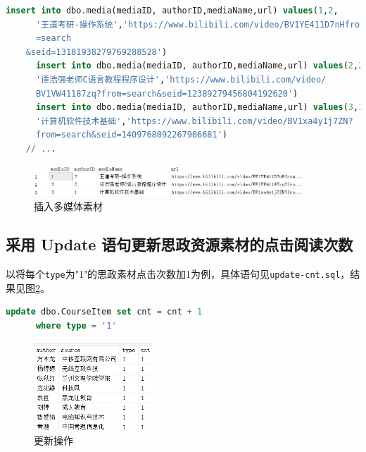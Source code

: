 \documentclass[11pt]{article}
\begin{document}
  \begin{file}
    \begin{lstlisting}[language=sql]
      insert into dbo.media(mediaID, authorID,mediaName,url) values(1,2,
      '王道考研-操作系统','https://www.bilibili.com/video/BV1YE411D7nHfrom
      =search
    &seid=13181938279769288528')
      insert into dbo.media(mediaID, authorID,mediaName,url) values(2,2,
      '谭浩强老师C语言教程程序设计','https://www.bilibili.com/video/
      BV1VW41187zq?from=search&seid=12389279456804192620')
      insert into dbo.media(mediaID, authorID,mediaName,url) values(3,1,
      '计算机软件技术基础','https://www.bilibili.com/video/BV1xa4y1j7ZN?
      from=search&seid=1409768092267906681')
    // ...
    \end{lstlisting}
  \end{file}

  \begin{figure}[h]
    \centering
    \includegraphics[width=0.9\textwidth]{insert-media.png}
    \caption{插入多媒体素材}
    \label{fig:insert-media}
  \end{figure}



  \subsection{采用 Update 语句更新思政资源素材的点击阅读次数}
  以将每个\verb|type|为"1"的思政素材点击次数加1为例，具体语句见\verb|update-cnt.sql|，结果见图\ref{fig:update}。

  \begin{file}
    \begin{lstlisting}[language=sql]
      update dbo.CourseItem set cnt = cnt + 1
      where type = '1'
    \end{lstlisting}
  \end{file}

  \begin{figure}[h]
    \centering
    \includegraphics[width=0.4\textwidth]{update.png}
    \caption{更新操作}
    \label{fig:update}
  \end{figure}
\end{document}

